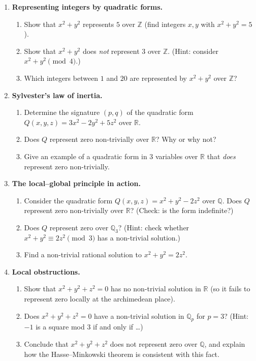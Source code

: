 \begin{enumerate}

    \item \textbf{Representing integers by quadratic forms.}
    \begin{enumerate}
        \item Show that $x^2 + y^2$ represents $5$ over $\mathbb{Z}$ (find integers $x, y$ with $x^2 + y^2 = 5$).
        \item Show that $x^2 + y^2$ does \emph{not} represent $3$ over $\mathbb{Z}$. (Hint: consider $x^2 + y^2 \pmod{4}$.)
        \item Which integers between $1$ and $20$ are represented by $x^2 + y^2$ over $\mathbb{Z}$?
    \end{enumerate}

    \item \textbf{Sylvester's law of inertia.}
    \begin{enumerate}
        \item Determine the signature $(p, q)$ of the quadratic form $Q(x,y,z) = 3x^2 - 2y^2 + 5z^2$ over $\mathbb{R}$.
        \item Does $Q$ represent zero non-trivially over $\mathbb{R}$? Why or why not?
        \item Give an example of a quadratic form in 3 variables over $\mathbb{R}$ that \emph{does} represent zero non-trivially.
    \end{enumerate}

    \item \textbf{The local--global principle in action.}
    \begin{enumerate}
        \item Consider the quadratic form $Q(x, y, z) = x^2 + y^2 - 2z^2$ over $\mathbb{Q}$. Does $Q$ represent zero non-trivially over $\mathbb{R}$? (Check: is the form indefinite?)
        \item Does $Q$ represent zero over $\mathbb{Q}_3$? (Hint: check whether $x^2 + y^2 \equiv 2z^2 \pmod{3}$ has a non-trivial solution.)
        \item Find a non-trivial rational solution to $x^2 + y^2 = 2z^2$.
    \end{enumerate}

    \item \textbf{Local obstructions.}
    \begin{enumerate}
        \item Show that $x^2 + y^2 + z^2 = 0$ has no non-trivial solution in $\mathbb{R}$ (so it fails to represent zero locally at the archimedean place).
        \item Does $x^2 + y^2 + z^2 = 0$ have a non-trivial solution in $\mathbb{Q}_p$ for $p = 3$? (Hint: $-1$ is a square mod $3$ if and only if \ldots)
        \item Conclude that $x^2 + y^2 + z^2$ does not represent zero over $\mathbb{Q}$, and explain how the Hasse--Minkowski theorem is consistent with this fact.
    \end{enumerate}


\end{enumerate}
